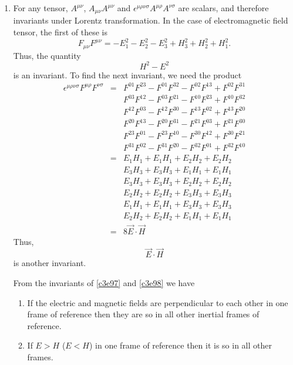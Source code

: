 \begin{enumerate}
\item For any tensor, $A^{\mu\nu}$, $A_{\mu\nu}A^{\mu\nu}$ and 
$\epsilon^{\mu\rho\nu\sigma}A^{\mu\rho}A^{\nu\sigma}$ are scalars, and therefore
invariants under Lorentz transformation. In the case of electromagnetic field
tensor, the first of these is
\[
F_{\mu\nu}F^{\mu\nu} = -E_1^2 - E_2^2 - E_3^2 + H_3^2 + H_2^2 + H_1^2.
\]
Thus, the quantity 
\begin{equation}\label{c3e98}
H^2 - E^2
\end{equation}
is an invariant. To find the next invariant, we
need the product
\begin{eqnarray*}
\epsilon^{\mu\rho\nu\sigma}F^{\mu\rho}F^{\nu\sigma} &=& F^{01}F^{23} - F^{01}F^{32} - F^{02}F^{13} + F^{02}F^{31} \\
 & & F^{03}F^{12} - F^{03}F^{21} - F^{10}F^{23} + F^{10}F^{32} \\
 & & F^{12}F^{03} - F^{12}F^{30} - F^{13}F^{02} + F^{13}F^{20} \\
 & & F^{20}F^{13} - F^{20}F^{31} - F^{21}F^{03} + F^{21}F^{30} \\
 & & F^{23}F^{01} - F^{23}F^{10} - F^{30}F^{12} + F^{30}F^{21} \\
 & & F^{31}F^{02} - F^{31}F^{20} - F^{32}F^{01} + F^{32}F^{10} \\
 &=& E_1H_1 + E_1H_1 + E_2H_2 + E_2H_2 \\
 & & E_3H_3 + E_3H_3 + E_1H_1 + E_1H_1 \\
 & & E_3H_3 + E_3H_3 + E_2H_2 + E_2H_2 \\
 & & E_2H_2 + E_2H_2 + E_3H_3 + E_3H_3 \\
 & & E_1H_1 + E_1H_1 + E_3H_3 + E_3H_3 \\
 & & E_2H_2 + E_2H_2 + E_1H_1 + E_1H_1 \\
 &=& 8\vec{E}\cdot\vec{H}
\end{eqnarray*}
Thus, \begin{equation}\label{c3e99}
\vec{E}\cdot\vec{H}
\end{equation}
is another invariant.

From the invariants of \eqref{c3e97} and \eqref{c3e98} we have
\begin{enumerate}
\item If the electric and magnetic fields are
perpendicular to each other in one frame of reference then they are so in all 
other inertial frames of reference.

\item If $E > H$ ($E < H$) in one frame of reference then it is so in all other
frames.


\end{enumerate}
\end{enumerate}
